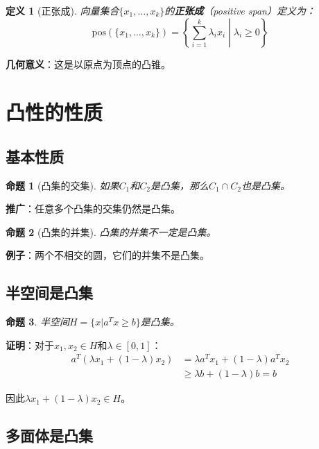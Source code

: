 \documentclass[12pt,a4paper]{article}
\newtheorem{definition}{定义}
\newtheorem{proposition}{命题}
\begin{document}
\begin{definition}[正张成]
向量集合$\{x_1, \ldots, x_k\}$的\textbf{正张成}（positive span）定义为：
\begin{equation}
\text{pos}(\{x_1, \ldots, x_k\}) = \left\{\sum_{i=1}^k \lambda_i x_i \middle| \lambda_i \geq 0\right\}
\end{equation}
\end{definition}

\textbf{几何意义}：这是以原点为顶点的凸锥。

\section{凸性的性质}

\subsection{基本性质}

\begin{proposition}[凸集的交集]
如果$C_1$和$C_2$是凸集，那么$C_1 \cap C_2$也是凸集。
\end{proposition}

\textbf{推广}：任意多个凸集的交集仍然是凸集。

\begin{proposition}[凸集的并集]
凸集的并集不一定是凸集。
\end{proposition}

\textbf{例子}：两个不相交的圆，它们的并集不是凸集。

\subsection{半空间是凸集}

\begin{proposition}
半空间$H = \{x | a^T x \geq b\}$是凸集。
\end{proposition}

\textbf{证明}：对于$x_1, x_2 \in H$和$\lambda \in [0, 1]$：
\begin{align}
a^T (\lambda x_1 + (1-\lambda) x_2) &= \lambda a^T x_1 + (1-\lambda) a^T x_2 \\
&\geq \lambda b + (1-\lambda) b = b
\end{align}

因此$\lambda x_1 + (1-\lambda) x_2 \in H$。

\subsection{多面体是凸集}
\end{document}
